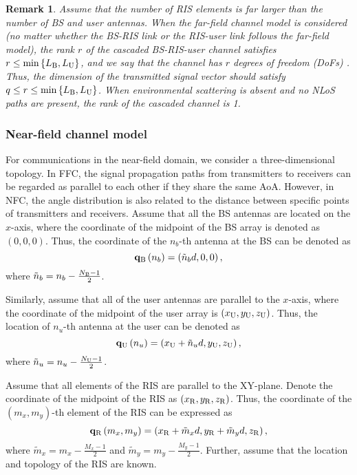 \documentclass[lettersize, journal]{IEEEtran}
\newtheorem{myRemark}{Remark}
\begin{document}
\begin{myRemark} \label{Remark_FarFieldRank}
Assume that the number of RIS elements is far larger than the number of BS and user antennas.
When the far-field channel model is considered (no matter whether the BS-RIS link or the RIS-user link follows the far-field model), the rank $r$ of the cascaded BS-RIS-user channel satisfies $r \le \min \left\{ L_{\rm{B}}, L_{\rm{U}} \right\}$, and we say that the channel has $r$ degrees of freedom (DoFs) {\cite{NFC_DOF}}. Thus, the dimension of the transmitted signal vector should satisfy $q \le r \le \min \left\{ L_{\rm{B}}, L_{\rm{U}} \right\}$.
When environmental scattering is absent and no NLoS paths are present, the rank of the cascaded channel is 1.
\end{myRemark}


\subsubsection{Near-field channel model}

For communications in the near-field domain, we consider a three-dimensional topology.
In FFC, the signal propagation paths from transmitters to receivers can be regarded as parallel to each other if they share the same AoA. 
However, in NFC, the angle distribution is also related to the distance between specific points of transmitters and receivers.
Assume that all the BS antennas are located on the $x$-axis, where the coordinate of the midpoint of the BS array is denoted as $\left( 0, 0, 0 \right) $. 
Thus, the coordinate of the $n_b$-th antenna at the BS can be denoted as 
\begin{equation}
{\bf{q}}_{\rm{B}}\left( n_b \right) = \left( {{\tilde n}_b}d, 0, 0 \right), 
\end{equation}
where ${{\tilde n}_b} = n_b - \frac{N_{\rm{B}} - 1}{2}$.

Similarly, assume that all of the user antennas are parallel to the $x$-axis, where the coordinate of the midpoint of the user array is $\left( x_{\rm{U}}, y_{\rm{U}}, z_{\rm{U}} \right) $. 
Thus, the location of $n_u$-th antenna at the user can be denoted as 
\begin{equation}
{\bf{q}}_{\rm{U}}\left( n_u \right) = \left( x_{\rm{U}} + {{\tilde n}_u}d, y_{\rm{U}}, z_{\rm{U}} \right), 
\end{equation}
where ${{\tilde n}_u} = n_u - \frac{N_{\rm{U}} - 1}{2}$.

Assume that all elements of the RIS are parallel to the XY-plane.
Denote the coordinate of the midpoint of the RIS as $\left( x_{\rm{R}}, y_{\rm{R}}, z_{\rm{R}} \right) $.
Thus, the coordinate of the $\left( m_x, m_y\right)$-th element of the RIS can be expressed as 
\begin{equation}
{\bf{q}}_{\rm{R}}\left( m_x, m_y \right) = \left( x_{\rm{R}}+{{\tilde m}_x}d, y_{\rm{R}}+{{\tilde m}_y}d, z_{\rm{R}} \right) ,
\end{equation} 
where ${{\tilde m}_x} = m_x - \frac{M_x - 1}{2}$ and ${{\tilde m}_y} = m_y - \frac{M_y - 1}{2}$.
Further, assume that the location and topology  of the RIS are known.
\end{document}
